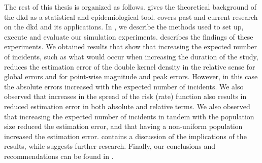 The rest of this thesis is organized as follows.
 gives the theoretical background of the \gls{dkd} as a statistical and epidemiological tool.
 covers past and current research on the \gls{dkd} and its applications.
In , we describe the methods used to set up, execute and evaluate our simulation experiments.
 describes the findings of these experiments.
We obtained results that show that increasing the expected number of incidents,
such as what would occur when increasing the duration of the study,
reduces the estimation error of the double kernel density in the relative sense
for global errors and for point-wise magnitude and peak errors.
However, in this case the absolute errors increased with the expected number of incidents.
We also observed that increases in the spread of the risk (rate) function also results in reduced estimation error
in both absolute and relative terms.
We also observed that increasing the expected number of incidents in tandem with the population size reduced the estimation error,
and that having a non-uniform population increased the estimation error.
 contains a discussion of the implications of the results,
while  suggests further research.
Finally, our conclusions and recommendations can be found in .

